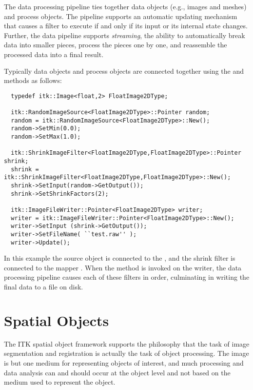 
The data processing pipeline ties together data objects (e.g., images and
meshes) and process objects. The pipeline supports an automatic updating
mechanism that causes a filter to execute if and only if its input 
or its internal state changes. Further, the data pipeline supports
\emph{streaming}, the ability to automatically break data into smaller
pieces, process the pieces one by one, and reassemble the processed data into
a final result.

Typically data objects and process objects are connected together using the
 and  methods as follows:

\small
\begin{verbatim}
  typedef itk::Image<float,2> FloatImage2DType;

  itk::RandomImageSource<FloatImage2DType>::Pointer random;
  random = itk::RandomImageSource<FloatImage2DType>::New();
  random->SetMin(0.0);
  random->SetMax(1.0);

  itk::ShrinkImageFilter<FloatImage2DType,FloatImage2DType>::Pointer shrink;
  shrink = itk::ShrinkImageFilter<FloatImage2DType,FloatImage2DType>::New();
  shrink->SetInput(random->GetOutput());
  shrink->SetShrinkFactors(2);

  itk::ImageFileWriter::Pointer<FloatImage2DType> writer;
  writer = itk::ImageFileWriter::Pointer<FloatImage2DType>::New();
  writer->SetInput (shrink->GetOutput());
  writer->SetFileName( ``test.raw'' );
  writer->Update();
\end{verbatim}
\normalsize 

In this example the source object  is connected
to the , and the shrink filter is connected to
the mapper . When the  method is
invoked on the writer, the data processing pipeline causes each of these
filters in order, culminating in writing the final data to a file on disk.

%
%
%
%
\section{Spatial Objects}
\label{sec:SpatialObjectsOverview}
%
The ITK spatial object framework supports the philosophy that the task of
image segmentation and registration is actually the task of object
processing. The image is but one medium for representing objects of interest,
and much processing and data analysis can and should occur at the object
level and not based on the medium used to represent the object.

